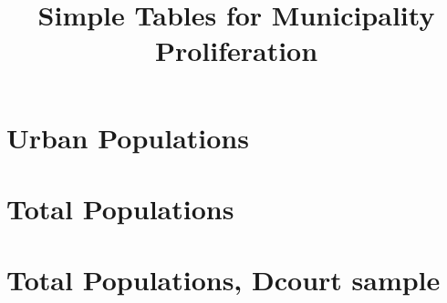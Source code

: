 \documentclass{article}
\title{Simple Tables for Municipality Proliferation}
\begin{document}
\maketitle
\tableofcontents
{\footnotesize 
\listoffigures
\listoftables}
\clearpage

\section{Urban Populations}

\clearpage
\begin{landscape}

\clearpage

\clearpage
\clearpage

\clearpage

\clearpage
\end{landscape}

\section{Total Populations}

\clearpage
\begin{landscape}

\clearpage

\clearpage

\clearpage

\clearpage
\end{landscape}

\section{Total Populations, Dcourt sample}

\clearpage
\begin{landscape}

\clearpage

\clearpage

\clearpage

\clearpage
\end{landscape}
\end{document}
